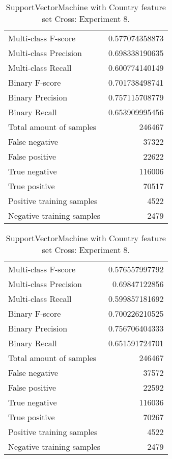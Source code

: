 \begin{table}[H]
\begin{minipage}{0.5\textwidth}
\caption{SupportVectorMachine with Country feature set Cross: Experiment 7.}
\centering
\begin{tabular}{l r}
\toprule
Multi-class F-score & 0.577074358873 \\
Multi-class Precision & 0.698338190635 \\
Multi-class Recall & 0.600774140149 \\
\midrule
Binary F-score & 0.701738498741 \\
Binary Precision & 0.757115708779 \\
Binary Recall & 0.653909995456 \\
\midrule
Total amount of samples & 246467 \\
False negative & 37322 \\
False positive & 22622 \\
True negative & 116006 \\
True positive & 70517 \\
\midrule
Positive training samples & 4522 \\
Negative training samples & 2479 \\
\bottomrule
\end{tabular}
\end{minipage}
\hfillx
\begin{minipage}{0.5\textwidth}
\caption{SupportVectorMachine with Country feature set Cross: Experiment 8.}
\centering
\begin{tabular}{l r}
\toprule
Multi-class F-score & 0.576557997792 \\
Multi-class Precision & 0.69847122856 \\
Multi-class Recall & 0.599857181692 \\
\midrule
Binary F-score & 0.700226210525 \\
Binary Precision & 0.756706404333 \\
Binary Recall & 0.651591724701 \\
\midrule
Total amount of samples & 246467 \\
False negative & 37572 \\
False positive & 22592 \\
True negative & 116036 \\
True positive & 70267 \\
\midrule
Positive training samples & 4522 \\
Negative training samples & 2479 \\
\bottomrule
\end{tabular}
\end{minipage}
\end{table}
